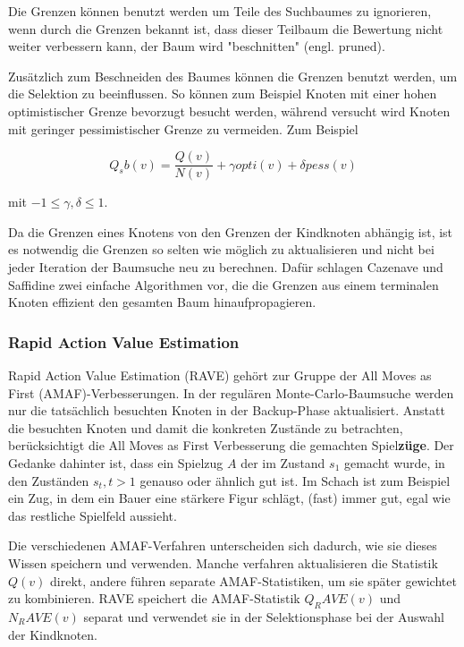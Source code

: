 Die Grenzen können benutzt werden um Teile des Suchbaumes zu ignorieren, wenn durch die Grenzen bekannt ist, dass dieser Teilbaum die Bewertung nicht weiter verbessern kann, der Baum wird "beschnitten" (engl. pruned).

Zusätzlich zum Beschneiden des Baumes können die Grenzen benutzt werden, um die Selektion zu beeinflussen. So können zum Beispiel Knoten mit einer hohen optimistischer Grenze bevorzugt besucht werden, während versucht wird Knoten mit geringer pessimistischer Grenze zu vermeiden. Zum Beispiel

\begin{equation}
Q_sb(v) = \frac{Q(v)}{N(v)} + \gamma opti(v) + \delta pess(v)
\label{eqn:scorebound}
\end{equation}

mit $-1 \le \gamma, \delta \le 1$.

Da die Grenzen eines Knotens von den Grenzen der Kindknoten abhängig ist, ist es notwendig die Grenzen so selten wie möglich zu aktualisieren und nicht bei jeder Iteration der Baumsuche neu zu berechnen. Dafür schlagen Cazenave und Saffidine zwei einfache Algorithmen vor, die die Grenzen aus einem terminalen Knoten effizient den gesamten Baum hinaufpropagieren.


\subsubsection{Rapid Action Value Estimation}

Rapid Action Value Estimation (RAVE) gehört zur Gruppe der All Moves as First (AMAF)-Verbesserungen. In der regulären Monte-Carlo-Baumsuche werden nur die tatsächlich besuchten Knoten in der Backup-Phase aktualisiert. Anstatt die besuchten Knoten und damit die konkreten Zustände zu betrachten, berücksichtigt die All Moves as First Verbesserung die gemachten Spiel\textbf{züge}. Der Gedanke dahinter ist, dass ein Spielzug $A$ der im Zustand $s_1$ gemacht wurde, in den Zuständen $s_t, t > 1$ genauso oder ähnlich gut ist. Im Schach ist zum Beispiel ein Zug, in dem ein Bauer eine stärkere Figur schlägt, (fast) immer gut, egal wie das restliche Spielfeld aussieht.

Die verschiedenen AMAF-Verfahren unterscheiden sich dadurch, wie sie dieses Wissen speichern und verwenden. Manche verfahren aktualisieren die Statistik $Q(v)$ direkt, andere führen separate AMAF-Statistiken, um sie später gewichtet zu kombinieren. RAVE speichert die AMAF-Statistik $Q_RAVE(v)$ und $N_RAVE(v)$ separat und verwendet sie in der Selektionsphase bei der Auswahl der Kindknoten.

